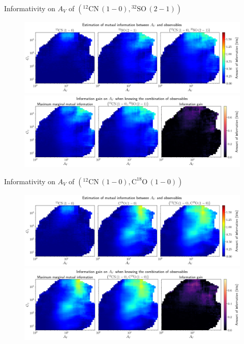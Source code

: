 \documentclass{beamer}
\begin{document}
\begin{frame}{Informativity on $A_V$ of $\left(\mathrm{^{12}CN\,(1-0)},\mathrm{^{32}SO\,(2-1)}\right)$}
    \begin{figure}
        \centering
        \includegraphics[width=0.95\linewidth]{../mi/av__12cn10_32so21_mi.png}
        \vfill
        \includegraphics[width=0.95\linewidth]{../mi/av__12cn10_32so21_mi_gain.png}
    \end{figure}
\end{frame}

\begin{frame}{Informativity on $A_V$ of $\left(\mathrm{^{12}CN\,(1-0)},\mathrm{C^{18}O\,(1-0)}\right)$}
    \begin{figure}
        \centering
        \includegraphics[width=0.95\linewidth]{../mi/av__12cn10_c18o10_mi.png}
        \vfill
        \includegraphics[width=0.95\linewidth]{../mi/av__12cn10_c18o10_mi_gain.png}
    \end{figure}
\end{frame}
\end{document}
